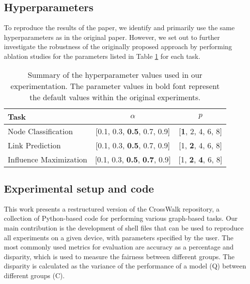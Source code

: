 
\subsection{Hyperparameters}
To reproduce the results of the paper, we identify and primarily use the same hyperparameters as in the original paper. However, we set out to further investigate the robustness of the originally proposed approach by performing ablation studies for the parameters listed in Table \ref{tab:params} for each task.

\label{sec:hyperparams}

\begin{table}[H]
    \begin{tabular}{l c c}
        \toprule
        \textbf{Task} & \textbf{$\alpha$} & \textbf{$p$} \\
        \midrule 
        Node Classification   & [0.1, 0.3, \textbf{0.5}, 0.7, 0.9] & [\textbf{1}, 2, 4, 6, 8] \\
        Link Prediction       & [0.1, 0.3, \textbf{0.5}, 0.7, 0.9] & [1, \textbf{2}, 4, 6, 8]  \\
        Influence Maximization & [0.1, 0.3, \textbf{0.5}, \textbf{0.7}, 0.9] & [1, \textbf{2}, \textbf{4}, 6, 8]  \\
        \bottomrule
    \end{tabular}
    \centering
    \caption{Summary of the hyperparameter values used in our experimentation. The parameter values in bold font represent the default values within the original experiments.}
    \label{tab:params}
\end{table}

\subsection{Experimental setup and code}

This work presents a restructured version of the CrossWalk repository, a collection of Python-based code for performing various graph-based tasks. Our main contribution is the development of shell files that can be used to reproduce all experiments on a given device, with parameters specified by the user. The most commonly used metrics for evaluation are accuracy as a percentage and disparity, which is used to measure the fairness between different groups. The disparity is calculated as the variance of the performance of a model (Q) between different groups (C).
\vspace{-1mm}

